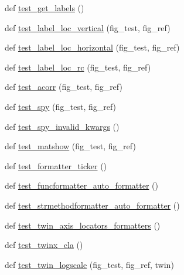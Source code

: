 \begin{DoxyCompactItemize}
\item 
def \hyperlink{namespacematplotlib_1_1tests_1_1test__axes_a114653e4531df5eb721089873b6ca205}{test\+\_\+get\+\_\+labels} ()
\item 
def \hyperlink{namespacematplotlib_1_1tests_1_1test__axes_ac7d066cd6fbcd2022c9a9fa709750706}{test\+\_\+label\+\_\+loc\+\_\+vertical} (fig\+\_\+test, fig\+\_\+ref)
\item 
def \hyperlink{namespacematplotlib_1_1tests_1_1test__axes_ad1e86f3483d66d5aa4ac0e0169b2d9d3}{test\+\_\+label\+\_\+loc\+\_\+horizontal} (fig\+\_\+test, fig\+\_\+ref)
\item 
def \hyperlink{namespacematplotlib_1_1tests_1_1test__axes_ac997e0ddba5c3aba1da335886eb4b34d}{test\+\_\+label\+\_\+loc\+\_\+rc} (fig\+\_\+test, fig\+\_\+ref)
\item 
def \hyperlink{namespacematplotlib_1_1tests_1_1test__axes_a92b014450a284ab31879b44baa578b65}{test\+\_\+acorr} (fig\+\_\+test, fig\+\_\+ref)
\item 
def \hyperlink{namespacematplotlib_1_1tests_1_1test__axes_a308fcdb3782ec300b7450a070c183d51}{test\+\_\+spy} (fig\+\_\+test, fig\+\_\+ref)
\item 
def \hyperlink{namespacematplotlib_1_1tests_1_1test__axes_a7c336486a82a784b6ba30778a9c95063}{test\+\_\+spy\+\_\+invalid\+\_\+kwargs} ()
\item 
def \hyperlink{namespacematplotlib_1_1tests_1_1test__axes_acdabab211d7a1e6132c83e3cc1b7c822}{test\+\_\+matshow} (fig\+\_\+test, fig\+\_\+ref)
\item 
def \hyperlink{namespacematplotlib_1_1tests_1_1test__axes_a49b7efe032a0dd0a6f144457a87a5d67}{test\+\_\+formatter\+\_\+ticker} ()
\item 
def \hyperlink{namespacematplotlib_1_1tests_1_1test__axes_abcf952ed4b3923f4989c3f2e1f1ef2d3}{test\+\_\+funcformatter\+\_\+auto\+\_\+formatter} ()
\item 
def \hyperlink{namespacematplotlib_1_1tests_1_1test__axes_aec74d02a90f6335e3592a006cbbac8e0}{test\+\_\+strmethodformatter\+\_\+auto\+\_\+formatter} ()
\item 
def \hyperlink{namespacematplotlib_1_1tests_1_1test__axes_ad1f2ce4a765f3c7999c32a419102ac57}{test\+\_\+twin\+\_\+axis\+\_\+locators\+\_\+formatters} ()
\item 
def \hyperlink{namespacematplotlib_1_1tests_1_1test__axes_a8324c9ef6e49a725e0ea8fd19fcbe457}{test\+\_\+twinx\+\_\+cla} ()
\item 
def \hyperlink{namespacematplotlib_1_1tests_1_1test__axes_acfb274134d6eafd1b6c46065ef66377e}{test\+\_\+twin\+\_\+logscale} (fig\+\_\+test, fig\+\_\+ref, twin)

\end{DoxyCompactItemize}
